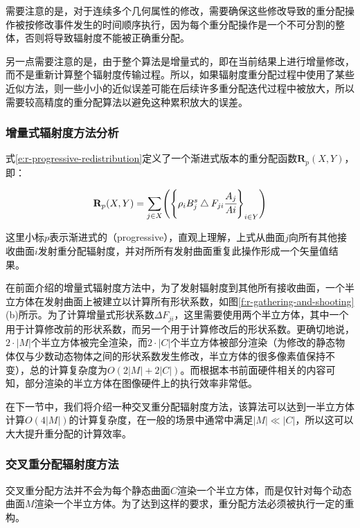 需要注意的是，对于连续多个几何属性的修改，需要确保这些修改导致的重分配操作被按修改事件发生的时间顺序执行，因为每个重分配操作是一个不可分割的整体，否则将导致辐射度不能被正确重分配。

另一点需要注意的是，由于整个算法是增量式的，即在当前结果上进行增量修改，而不是重新计算整个辐射度传输过程。所以，如果辐射度重分配过程中使用了某些近似方法，则一些小小的近似误差可能在后续许多重分配迭代过程中被放大，所以需要较高精度的重分配算法以避免这种累积放大的误差。




\subsubsection{增量式辐射度方法分析}
式\ref{e:r-progressive-redistribution}定义了一个渐进式版本的重分配函数$\mathbf{R}_p(X,Y)$，即：

\begin{equation}\label{e:r-progressive-redistribution}
	\mathbf{R}_p(X,Y)=\sum_{j\in X}\Biggr(\Biggr\{ \rho_i B^{s}_j \bigtriangleup F_{ji} \cfrac{A_j}{Ai} \Biggr\}_{i\in Y}\Biggr)
\end{equation}

\noindent 这里小标$p$表示渐进式的（progressive），直观上理解，上式从曲面$j$向所有其他接收曲面$i$发射重分配辐射度，并对所所有发射曲面重复此操作形成一个矢量值结果。

在前面介绍的增量式辐射度方法中，为了发射辐射度到其他所有接收曲面，一个半立方体在发射曲面上被建立以计算所有形状系数，如图\ref{f:r-gathering-and-shooting}(b)所示。为了计算增量式形状系数$\Delta F_{ji}$，这里需要使用两个半立方体，其中一个用于计算修改前的形状系数，而另一个用于计算修改后的形状系数。更确切地说，$2\cdot|M|$个半立方体被完全渲染，而$2\cdot |C|$个半立方体被部分渲染（为修改的静态物体仅与少数动态物体之间的形状系数发生修改，半立方体的很多像素值保持不变），总的计算复杂度为$O(2|M|+2|C|)$。而根据本书前面硬件相关的内容可知，部分渲染的半立方体在图像硬件上的执行效率非常低。

在下一节中，我们将介绍一种交叉重分配辐射度方法，该算法可以达到一半立方体计算$O(4|M|)$的计算复杂度，在一般的场景中通常中满足$|M|\ll|C|$，所以这可以大大提升重分配的计算效率。




\subsubsection{交叉重分配辐射度方法}
交叉重分配方法并不会为每个静态曲面$C$渲染一个半立方体，而是仅针对每个动态曲面$M$渲染一个半立方体。为了达到这样的要求，重分配方法必须被执行一定的重构。


